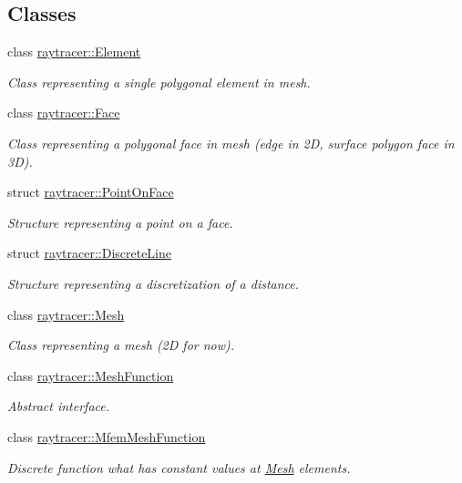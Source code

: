 \subsection*{Classes}
\begin{DoxyCompactItemize}
\item 
class \hyperlink{classraytracer_1_1Element}{raytracer\+::\+Element}
\begin{DoxyCompactList}\small\item\em Class representing a single polygonal element in mesh. \end{DoxyCompactList}\item 
class \hyperlink{classraytracer_1_1Face}{raytracer\+::\+Face}
\begin{DoxyCompactList}\small\item\em Class representing a polygonal face in mesh (edge in 2D, surface polygon face in 3D). \end{DoxyCompactList}\item 
struct \hyperlink{structraytracer_1_1PointOnFace}{raytracer\+::\+Point\+On\+Face}
\begin{DoxyCompactList}\small\item\em Structure representing a point on a face. \end{DoxyCompactList}\item 
struct \hyperlink{structraytracer_1_1DiscreteLine}{raytracer\+::\+Discrete\+Line}
\begin{DoxyCompactList}\small\item\em Structure representing a discretization of a distance. \end{DoxyCompactList}\item 
class \hyperlink{classraytracer_1_1Mesh}{raytracer\+::\+Mesh}
\begin{DoxyCompactList}\small\item\em Class representing a mesh (2D for now). \end{DoxyCompactList}\item 
class \hyperlink{classraytracer_1_1MeshFunction}{raytracer\+::\+Mesh\+Function}
\begin{DoxyCompactList}\small\item\em Abstract interface. \end{DoxyCompactList}\item 
class \hyperlink{classraytracer_1_1MfemMeshFunction}{raytracer\+::\+Mfem\+Mesh\+Function}
\begin{DoxyCompactList}\small\item\em Discrete function what has constant values at \hyperlink{classraytracer_1_1Mesh}{Mesh} elements. \end{DoxyCompactList}\item 

\end{DoxyCompactItemize}

